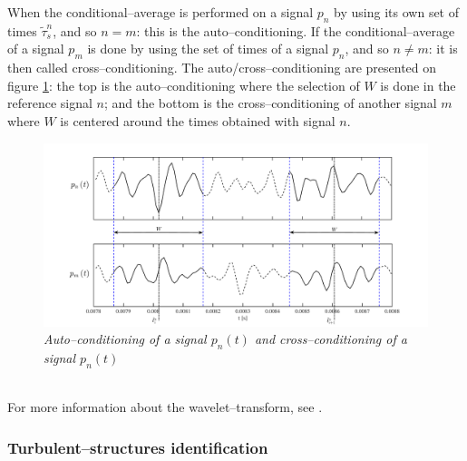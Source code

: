 \documentclass[english]{aiaa-tc}
\begin{document}
When the conditional--average is performed on a signal $p_{n}$ by using its own set of times ${\tilde{\tau}^n_{s}}$, and so $n = m$: this is the auto--conditioning. If the conditional--average of a signal $p_{m}$ is done by using the set of times of a signal $p_{n}$, and so $n \neq m$: it is then called cross--conditioning. The auto/cross--conditioning are presented on figure  \ref{fig:condNcond}: the top is the auto--conditioning where the selection of $W$ is done in the reference signal $n$; and the bottom is the cross--conditioning of another signal $m$ where $W$ is centered around the times obtained with signal $n$.
 \begin{figure}[!ht]
\centering
    \includegraphics[width=1\textwidth]{figures/pdf/condNcond}
\caption{\textit{Auto--conditioning of a signal $p_n(t)$ and cross--conditioning of a signal $p_n(t)$}}
\label{fig:condNcond}
\end{figure} \\
For more information about the wavelet--transform, see \cite{Farge1992}.

\subsubsection{Turbulent--structures identification}
\end{document}
